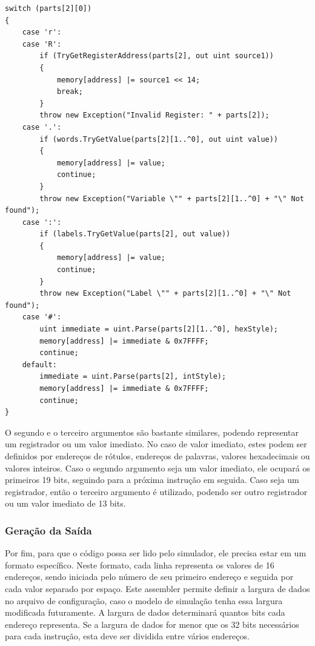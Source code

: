 \documentclass[
	article,			%
	11pt,				%
	oneside,			%
	a4paper,			%
	english,			%
	brazil,				%
	sumario=tradicional
	]{abntex2}
\begin{document}
\begin{lstlisting}
switch (parts[2][0])
{
    case 'r':
    case 'R':
        if (TryGetRegisterAddress(parts[2], out uint source1))
        {
            memory[address] |= source1 << 14;
            break;
        }
        throw new Exception("Invalid Register: " + parts[2]);                                        
    case '.':
        if (words.TryGetValue(parts[2][1..^0], out uint value))
        {
            memory[address] |= value;
            continue;
        }
        throw new Exception("Variable \"" + parts[2][1..^0] + "\" Not found");                    
    case ':':
        if (labels.TryGetValue(parts[2], out value))
        {
            memory[address] |= value;
            continue;
        }
        throw new Exception("Label \"" + parts[2][1..^0] + "\" Not found");
    case '#':
        uint immediate = uint.Parse(parts[2][1..^0], hexStyle);
        memory[address] |= immediate & 0x7FFFF;
        continue;
    default:
        immediate = uint.Parse(parts[2], intStyle);
        memory[address] |= immediate & 0x7FFFF;
        continue;
}
\end{lstlisting}
O segundo e o terceiro argumentos são bastante similares, podendo representar um registrador ou um valor imediato. No caso de valor imediato, estes podem ser definidos por endereços de rótulos, endereços de palavras, valores hexadecimais ou valores inteiros. Caso o segundo argumento seja um valor imediato, ele ocupará os primeiros 19 bits, seguindo para a próxima instrução em seguida. Caso seja um registrador, então o terceiro argumento é utilizado, podendo ser outro registrador ou um valor imediato de 13 bits.


\subsubsection{Geração da Saída}

Por fim, para que o código possa ser lido pelo simulador, ele precisa estar em um formato específico. Neste formato, cada linha representa os valores de 16 endereços, sendo iniciada pelo número de seu primeiro endereço e seguida por cada valor separado por espaço. Este assembler permite definir a largura de dados no arquivo de configuração, caso o modelo de simulação tenha essa largura modificada futuramente. A largura de dados determinará quantos bits cada endereço representa. Se a largura de dados for menor que os 32 bits necessários para cada instrução, esta deve ser dividida entre vários endereços.
\end{document}
